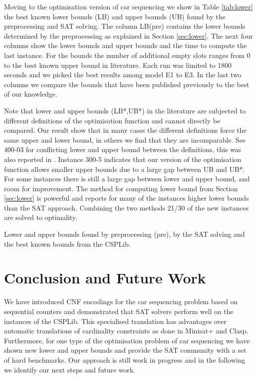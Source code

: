 \documentclass[]{llncs}
\begin{document}
Moving to the optimisation version of car sequencing we show in Table \ref{tab:lower} the best known lower bounds (LB)
and upper bounds (UB) found by the preprocessing and SAT solving. The column LB(pre) contains the lower bounds
determined by the preprocessing as explained in Section \ref{sec:lower}. The next four columns show the lower bounds and upper
bounds and the time to compute the last instance. For the bounds the number of additional empty slots ranges from 0 to
the best known upper bound in literature. Each run was limited to 1800 seconds and we picked the best results among
model E1 to E3. In the last two columns we compare the bounds that have been published previously to the best of our
knowledge.

Note that lower and upper bounds (LB*,UB*) in the literature are subjected to different definitions of the optimisation
function and cannot directly be compared. Our result show that in many cases the different definitions force the same
upper and lower bound, in others we find that they are incomparable. See 400-03 for conflicting lower and upper bound
between the definitions, this was also reported in \cite{Estellon06}. Instance 300-5 indicates that our version of the
optimisation function allows smaller upper bounds due to a large gap between UB and UB*. For some instances there is
still a large gap between lower and upper bound, and room for improvement.  The method for computing lower bound from
Section \ref{sec:lower} is powerful and reports for many of the instances higher lower bounds than the SAT approach.
Combining the two methods 21/30 of the new instances are solved to
optimality.

\begin{table}[htbp]
    \caption{Lower and upper bounds found by preprocessing (pre), by the SAT solving and the best known bounds from the
    CSPLib.}
    \centering
    
    \label{tab:lower}
\end{table}

\section{Conclusion and Future Work}

We have introduced CNF encodings for the car sequencing problem based on sequential counters and demonstrated that SAT
solvers perform well on the instances of the CSPLib. This specialised translation has advantages over automatic translations
of cardinality constraints as done in Minisat+ and Clasp. Furthermore, for one type of the optimisation problem of car
sequencing we have shown new lower and upper bounds and provide the SAT community with a set of hard benchmarks. Our
approach is still work in progress and in the following we identify our next steps and future work. 
\end{document}
